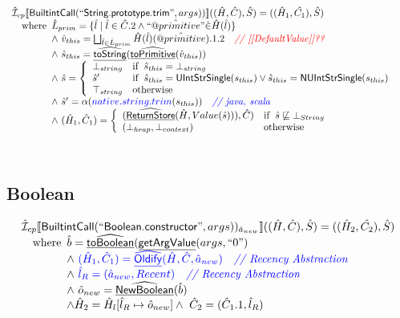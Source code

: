 \documentclass{article}
\makeatletter
\newcommand{\SF}[1]{\mbox{\textsf{#1}}}
\newcommand{\comment}[1]{\textit{#1}}
\newcommand{\wherec}[1]{{\rm where}\begin{array}[t]{l}#1\end{array}}
\newcommand{\ifc}[1]{{\rm if}\begin{array}[t]{l}#1\end{array}}
\newcommand{\owc}{{\rm otherwise}}
\newcommand{\aI}{\hat{\mathcal{I}}}
\newcommand{\lbr}{\llbracket}
\newcommand{\rbr}{\rrbracket}
\newcommand{\hf}[1]{\underline{\sf #1}}
\newcommand{\ahf}[1]{\widehat{\underline{\sf #1}}}
\newcommand{\avarprop}[1]{\hat{@#1}}
\def\inred{\color{red}}
\def\inblue{\color{blue}}
\def\inred{\color{red}}
\def\inblue{\color{blue}}
\makeatother
\begin{document}
\[\begin{array}{l}
\aI _{cp}\lbr \SF{BuiltintCall}(``\SF{String.prototype.trim}",args))\rbr((\hat{H},\hat{C}), \hat{S})
  = ((\hat{H}_1, \hat{C_1}), \hat{S})\\
\quad\wherec{ 
  \hat{L}_{prim} = \{ \hat{l} \mid \hat{l} \in \hat{C}.2 \land ``\avarprop{primitive}" \dot{\in}\hat{H}(\hat{l}) \}\\
  \land\ \hat{v}_{this} = \bigsqcup_{\hat{l} \in \hat{L}_{prim}} \hat{H}(\hat{l})(\avarprop{primitive}).1.2
    \quad\comment{{\inred // [[DefaultValue]]??}}\\
  \land\ \hat{s}_{this} = \ahf{toString}(\ahf{toPrimitive}(\hat{v}_{this}))\\
  \land\ \hat{s} = \left\{\begin{array}{ll}
      \bot_{string} & \ifc{\hat{s}_{this} = \bot_{string}}\\
      \hat{s}' & \ifc{\hat{s}_{this} = \SF{UIntStrSingle}(s_{this}) \lor \hat{s}_{this} = \SF{NUIntStrSingle}(s_{this}) }\\
      \top_{string} & \owc
    \end{array}\right.\\
  \land\ \hat{s}' = \alpha({\inblue native.string.trim}(s_{this}))
    \quad\comment{{\inblue // java, scala}}\\
  \land\ (\hat{H}_1, \hat{C}_1) = 
    \left\{\begin{array}{ll}
      (\ahf{ReturnStore}(\hat{H}, Value(\hat{s}))), \hat{C})
      & \ifc{\hat{s} \not\sqsubseteq \bot_{String}}\\
      (\bot_{heap}, \bot_{context}) & \owc \\
    \end{array}\right.\\
  }\\
\\\\
\end{array}
\]


\subsection{Boolean}
\[
\begin{array}{l}
\aI _{cp}\lbr \SF{BuiltintCall}(``\SF{Boolean.constructor}",args))_{\hat{a}_{new}}\rbr((\hat{H},\hat{C}), \hat{S})
  = ((\hat{H}_2, \hat{C_2}), \hat{S})\\
\quad\wherec{
   \hat{b} = \ahf{toBoolean}(\hf{getArgValue}(args, ``0")\\
   \land\ \inblue (\hat{H}_1, \hat{C}_1) = \ahf{Oldify}(\hat{H}, \hat{C}, \hat{a}_{new})
     \quad\comment{{\inblue // Recency Abstraction}}\\
   \land\ \inblue\hat{l}_{R} = (\hat{a}_{new}, Recent)
     \quad\comment{{\inblue // Recency Abstraction}}\\
  \land\ \hat{o}_{new} = \ahf{NewBoolean}(\hat{b})\\
  \land \hat{H}_2 = \hat{H}_l[\hat{l}_R \mapsto \hat{o}_{new}]
  \land\ \hat{C}_2 = (\hat{C}_1.1, \hat{l}_R)\\
  }\\
\end{array}
\]
\end{document}
